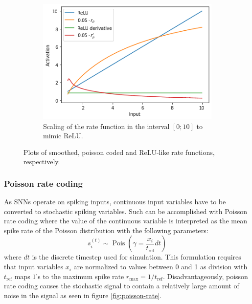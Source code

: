 \documentclass[a4paper,11pt]{article}
\DeclareMathOperator{\Pois}{Pois}
\begin{document}
\begin{figure}
\begin{subfigure}[t]{0.32\textwidth}
    \includegraphics[width=\textwidth]{graphics/rate-scaling.png}
    \caption{Scaling of the rate function in the interval $[0; 10]$ to mimic ReLU.}
    \label{fig:rate-scaling}
  \end{subfigure}
  \caption{Plots of smoothed, poisson coded and ReLU-like rate functions, respectively.}
\end{figure}



\subsubsection{Poisson rate coding}
As SNNs operate on spiking inputs, continuous input variables have to be converted to stochastic spiking variables. Such can be accomplished with Poisson rate coding where the value of the continuous variable is interpreted as the mean spike rate of the Poisson distribution with the following parameters:
\begin{equation}
  s_i^{(t)} \sim \Pois \left( \gamma = \frac{x_i}{t_\text{ref}} dt \right)
\end{equation}
where $dt$ is the discrete timestep used for simulation. This formulation requires that input variables $x_i$ are normalized to values between 0 and 1 as division with $t_\text{ref}$ maps $1$'s to the maximum spike rate $r_\text{max} = 1 / t_\text{ref}$. Disadvantageously, poisson rate coding causes the stochastic signal to contain a relatively large amount of noise in the signal as seen in figure \ref{fig:poisson-rate}.
\end{document}

